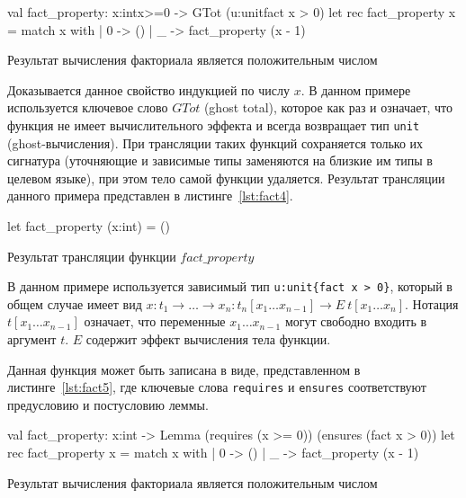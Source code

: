 \begin{listing}
\begin{pyglist}[language=ocaml,numbers=none,numbersep=5pt, fontsize=\small]
val fact_property: x:int{x>=0} -> GTot (u:unit{fact x > 0})
let rec fact_property x =
   match x with
   | 0 -> ()
   | _ -> fact_property (x - 1)
\end{pyglist}
\caption{Результат вычисления факториала является положительным числом}
\label{lst:fact3} 
\end{listing}

Доказывается данное свойство индукцией по числу $x$. В данном примере используется ключевое слово $GTot$ (ghost total), которое как раз и означает, что функция не имеет вычислительного эффекта и всегда возвращает тип \verb|unit| (ghost-вычисления). При трансляции таких функций сохраняется только их сигнатура (уточняющие и зависимые типы заменяются на близкие им типы в целевом языке), при этом тело самой функции удаляется. Результат трансляции данного примера представлен в листинге~\ref{lst:fact4}.

\begin{listing}
\begin{pyglist}[language=ocaml,numbers=none,numbersep=5pt, fontsize=\small]
let fact_property (x:int) = ()
\end{pyglist}
\caption{Результат трансляции функции $fact\_property$}
\label{lst:fact4} 
\end{listing}

В данном примере используется зависимый тип \verb|u:unit{fact x > 0}|, который в общем случае имеет  вид $x:t_1 \to \ldots \to x_n:t_n [x_1 \ldots x_{n-1}] \to E~t [x_1 \ldots x_n]$. Нотация $t [x_1 \ldots x_{n-1}]$ означает, что переменные $x_1 \ldots x_{n-1}$ могут свободно входить в аргумент $t$. $E$ содержит эффект вычисления тела функции.

Данная функция может быть записана в виде, представленном в листинге~\ref{lst:fact5}, где ключевые слова \verb|requires| и \verb|ensures| соответствуют предусловию и постусловию леммы.

\begin{listing}
\begin{pyglist}[language=ocaml,numbers=none,numbersep=5pt, fontsize=\small]
val fact_property: x:int -> Lemma
    (requires (x >= 0))
    (ensures (fact x > 0))
let rec fact_property x =
   match x with
   | 0 -> ()
   | _ -> fact_property (x - 1)
\end{pyglist}
\caption{Результат вычисления факториала является положительным числом}
\label{lst:fact5} 
\end{listing}

